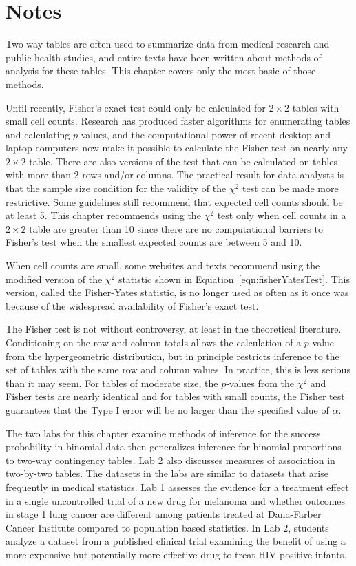 \section{Notes}
\label{infForPropNotes}

Two-way tables are often used to summarize data from medical research and public health studies, and entire texts have been written about methods of analysis for these tables.  This chapter covers only the most basic of those methods.

Until recently, Fisher's exact test could only be calculated for $2 \times 2$ tables with small cell counts. Research has produced faster algorithms for enumerating tables and calculating $p$-values, and the computational power of recent desktop and laptop computers now make it possible to calculate the Fisher test on nearly any $2 \times 2$ table.  There are also versions of the test that can be calculated on tables with more than 2 rows and/or columns.  The practical result for data analysts is that the sample size condition for the validity of the $\chi^2$ test can be made more restrictive.  Some guidelines still recommend that expected cell counts should be at least 5.  This chapter recommends using the $\chi^2$ test only when cell counts in a $2 \times 2$ table are greater than 10 since there are no computational barriers to Fisher's test when the smallest expected counts are between 5 and 10.

When cell counts are small, some websites and texts recommend using the modified version of the $\chi^2$ statistic shown in Equation~\ref{eqn:fisherYatesTest}. This version, called the Fisher-Yates statistic, is no longer used as often as it once was because of the widespread availability of Fisher's exact test.

The Fisher test is not without controversy, at least in the theoretical literature.  Conditioning on the row and column totals allows the calculation of a $p$-value from the hypergeometric distribution, but in principle restricts inference to the set of tables with the same row and column values.  In practice, this is less serious than it may seem. For tables of moderate size, the $p$-values from the $\chi^2$ and Fisher tests are nearly identical and for tables with small counts, the Fisher test guarantees that the Type I error will be no larger than the specified value of $\alpha$.

The two labs for this chapter examine methods of inference for the success probability in binomial data then generalizes inference for binomial proportions to two-way contingency tables.  Lab 2 also discusses measures of association in two-by-two tables.  The datasets in the labs are similar to datasets that arise frequently in medical statistics.  Lab 1 assesses the evidence for a treatment effect in a single uncontrolled trial of a new drug for melanoma and whether outcomes in stage 1 lung cancer are different among patients treated at Dana-Farber Cancer Institute compared to population based statistics. In Lab 2, students analyze a dataset from a published clinical trial examining the benefit of using a more expensive but potentially more effective drug to treat HIV-positive infants.
